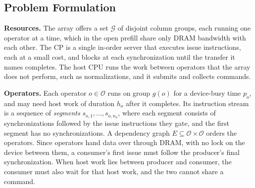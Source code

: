 \subsection{Problem Formulation}
\label{subsec:formulation}

\textbf{Resources.}
The array offers a set $\mathcal{G}$ of disjoint column groups, each running one operator at a time, which in the open prefill share only DRAM bandwidth with each other.
The CP is a single in-order server that executes issue instructions, each at a small cost, and blocks at each synchronization until the transfer it names completes.
The host CPU runs the work between operators that the array does not perform, such as normalizations, and it submits and collects commands.

\textbf{Operators.}
Each operator $o \in \mathcal{O}$ runs on group $g(o)$ for a device-busy time $p_o$, and may need host work of duration $h_o$ after it completes.
Its instruction stream is a sequence of \emph{segments} $s_{o,1}, \dots, s_{o,n_o}$, where each segment consists of synchronizations followed by the issue instructions they gate, and the first segment has no synchronizations.
A dependency graph $E \subseteq \mathcal{O} \times \mathcal{O}$ orders the operators.
Since operators hand data over through DRAM, with no lock on the device between them, a consumer's first issue must follow the producer's final synchronization.
When host work lies between producer and consumer, the consumer must also wait for that host work, and the two cannot share a command.

